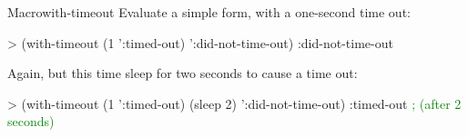 \begin{functiondoc}{Macro}{with-timeout}{\code{(} 
    \superstar{}\code{)}
    \superstar{} 
    \returns{} \superstar}
\fnexamples
Evaluate a simple form, with a one-second time out:
\begin{example}
> (with-timeout (1 ':timed-out) 
     ':did-not-time-out)
:did-not-time-out
\end{example}

Again, but this time sleep for two seconds to cause a time out:
\begin{example}
> (with-timeout (1 ':timed-out)
     (sleep 2) 
     ':did-not-time-out)
:timed-out              \textrm{\textcolor{green}{; (after 2 seconds)}}
\end{example}

\end{functiondoc}

